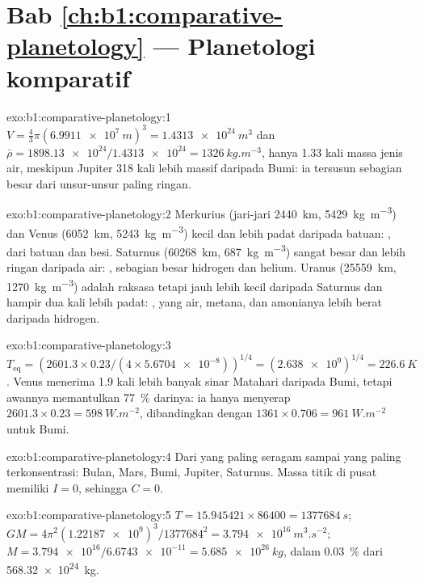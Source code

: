 \section*{Bab \ref{ch:b1:comparative-planetology} --- Planetologi komparatif}

\begin{solution}{exo:b1:comparative-planetology:1}
$V = \tfrac43\pi(\qty{6.9911e7}{m})^3 = \qty{1.4313e24}{m^3}$ dan
$\bar\rho = \num{1898.13e24}/\num{1.4313e24} = \qty{1326}{kg.m^{-3}}$, hanya
1.33 kali massa jenis air, meskipun Jupiter 318 kali lebih massif daripada Bumi: ia tersusun sebagian besar dari unsur-unsur paling ringan.
\end{solution}

\begin{solution}{exo:b1:comparative-planetology:2}
Merkurius (jari-jari \qty{2440}{km}, \qty{5429}{kg.m^{-3}}) dan Venus
(\qty{6052}{km}, \qty{5243}{kg.m^{-3}}) kecil dan lebih padat daripada batuan: , dari batuan dan besi. Saturnus (\qty{60268}{km},
\qty{687}{kg.m^{-3}}) sangat besar dan lebih ringan daripada air: , sebagian besar hidrogen dan helium. Uranus (\qty{25559}{km}, \qty{1270}{kg.m^{-3}}) adalah raksasa tetapi jauh lebih kecil daripada Saturnus dan hampir dua kali lebih padat: , yang air, metana, dan amonianya lebih berat daripada hidrogen.
\end{solution}

\begin{solution}{exo:b1:comparative-planetology:3}
$T_\mathrm{eq} = (2601.3\times0.23/(4\times\num{5.6704e-8}))^{1/4} =
(\num{2.638e9})^{1/4} = \qty{226.6}{K}$. Venus menerima 1.9 kali lebih banyak sinar Matahari daripada Bumi, tetapi awannya memantulkan \qty{77}{\percent} darinya: ia hanya menyerap $2601.3\times0.23 = \qty{598}{W.m^{-2}}$, dibandingkan dengan $1361\times0.706 = \qty{961}{W.m^{-2}}$ untuk Bumi.
\end{solution}

\begin{solution}{exo:b1:comparative-planetology:4}
Dari yang paling seragam sampai yang paling terkonsentrasi: Bulan, Mars, Bumi, Jupiter, Saturnus. Massa titik di pusat memiliki $I = 0$, sehingga $C = 0$.
\end{solution}

\begin{solution}{exo:b1:comparative-planetology:5}
$T = 15.945421\times86400 = \qty{1377684}{s}$;
$GM = 4\pi^2(\num{1.22187e9})^3/\num{1377684}^2 = \qty{3.794e16}{m^3.s^{-2}}$;
$M = \num{3.794e16}/\num{6.6743e-11} = \qty{5.685e26}{kg}$, dalam
\qty{0.03}{\percent} dari \qty{568.32e24}{kg}.
\end{solution}

